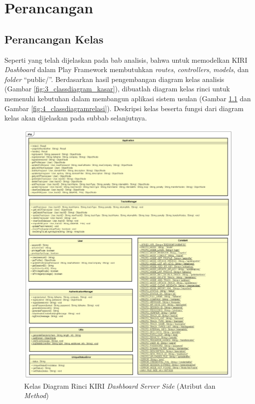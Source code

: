\chapter{Perancangan}
\label{chap:perancangan}

\section{Perancangan Kelas}
\label{sec:diagramkelas}
Seperti yang telah dijelaskan pada bab analisis, bahwa untuk memodelkan KIRI \textit{Dashboard} dalam Play Framework membutuhkan \textit{routes}, \textit{controllers}, \textit{models}, dan \textit{folder} ``public/''. Berdasarkan hasil pengembangan diagram kelas analisis (Gambar \ref{fig:3_classdiagram_kasar}), dibuatlah diagram kelas rinci untuk memenuhi kebutuhan dalam membangun aplikasi sistem usulan (Gambar \ref{fig:4_classdiagramatribut} dan Gambar \ref{fig:4_classdiagramrelasi}). Deskripsi kelas beserta fungsi dari diagram kelas akan dijelaskan pada subbab selanjutnya.

\begin{figure}[htbp]
	\centering
		\includegraphics[scale=0.45]{Gambar/4_classdiagram_atribut.png}
	\caption{Kelas Diagram Rinci KIRI \textit{Dashboard Server Side} (Atribut dan \textit{Method})}
	\label{fig:4_classdiagramatribut}
\end{figure}

